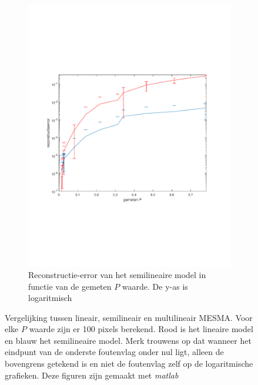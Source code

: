 \documentclass[12pt]{report}
\begin{document}
\begin{figure}
\begin{subfigure}[b]{0.5\textwidth}
\includegraphics[width=\textwidth,trim=0 200 0 175 cm]{PMC_10_100_EPlog.pdf}
\caption{Reconstructie-error van het semilineaire model in functie van de gemeten $P$ waarde. De y-as is logaritmisch \label{fig:EPlog} }
\end{subfigure}
\caption{Vergelijking tussen lineair, semilineair en multilineair MESMA. Voor elke $P$ waarde zijn er 100 pixels berekend. Rood is het lineaire model en blauw het semilineaire model. Merk trouwens op dat wanneer het eindpunt van de onderste foutenvlag onder nul ligt, alleen de bovengrens getekend is en niet de foutenvlag zelf op de logaritmische grafieken. Deze figuren zijn gemaakt met \textit{matlab}\cite{matlab}\label{fig:e100}}
\end{figure}
\end{document}
